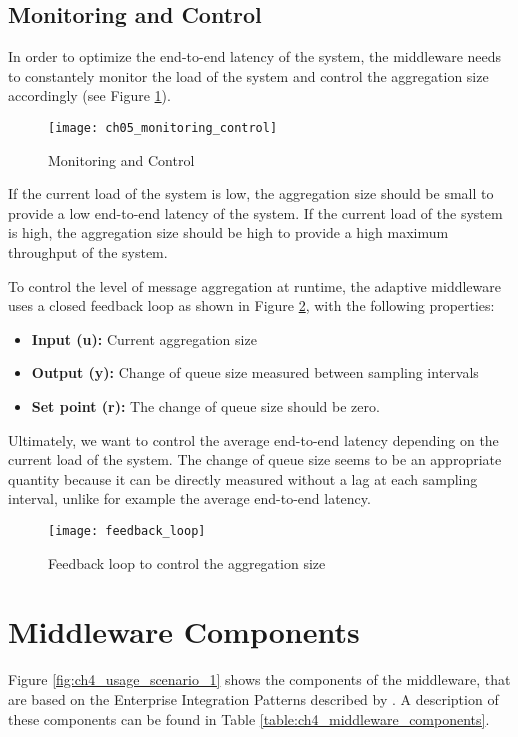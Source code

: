 \subsection{Monitoring and Control}

In order to optimize the end-to-end latency of the system, the middleware needs to constantely monitor the load of the system and control the aggregation size accordingly (see Figure \ref{fig:ch05_monitoring_control}).

\begin{figure}[htbp]
	\centering
	\texttt{[image: ch05\_monitoring\_control]}
	\caption{Monitoring and Control}
	\label{fig:ch05_monitoring_control}
\end{figure}

If the current load of the system is low, the aggregation size should be small to provide a low end-to-end latency of the system. If the current load of the system is high, the aggregation size should be high to provide a high maximum throughput of the system.

To control the level of message aggregation at runtime, the adaptive middleware uses a closed feedback loop as shown in Figure \ref{fig:feedback_loop}, with the following properties:

\begin{itemize}
	\item \textbf{Input (u):} Current aggregation size
	\item \textbf{Output (y):} Change of queue size measured between sampling intervals
	\item \textbf{Set point (r):} The change of queue size should be zero.
\end{itemize}

Ultimately, we want to control the average end-to-end latency depending on the current load of the system. The change of queue size seems to be an appropriate quantity because it can be directly measured without a lag at each sampling interval, unlike for example the average end-to-end latency.

\begin{figure}[htbp]
	\centering
	\texttt{[image: feedback\_loop]}
	\caption{Feedback loop to control the aggregation size}
	\label{fig:feedback_loop}
\end{figure}

\section{Middleware Components}
\label{sec:ch05_middleware_components}
Figure \ref{fig:ch4_usage_scenario_1} shows the components of the middleware, that are based on the Enterprise Integration Patterns described by \cite{Hohpe:2003fk}. A description of these components can be found in Table \ref{table:ch4_middleware_components}.

